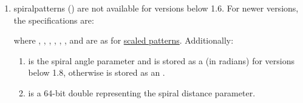 \begin{numbered}
\begin{enumerate}
  \item\label{jdr:spiral}%
  \Glspl{spiralpattern} () are not available for versions below 1.6.
  For newer versions, the specifications are:
  \begin{syntaxline}
     
      
  \end{syntaxline}
  where , , ,
  , , ,  and
   are as for \hyperref[jdr:scaled]{scaled patterns}. Additionally:
    \begin{enumerate}
    \item {} is the spiral angle
    parameter and is stored as a  (in radians) for
    versions below 1.8, otherwise is stored as an .

    \item {} is a 64-bit double representing the spiral
      distance parameter.
    \end{enumerate}%
  \end{enumerate}%
\end{numbered}%


